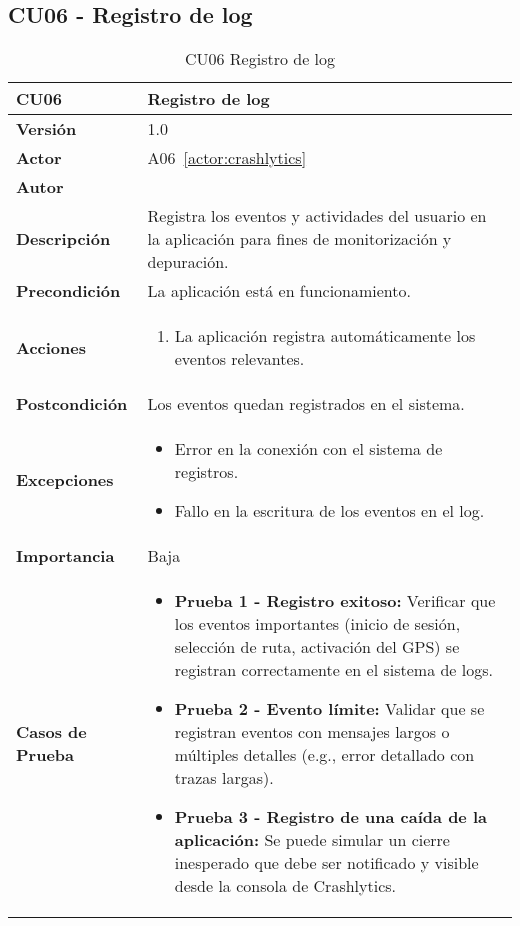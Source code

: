 \subsection{CU06 - Registro de log}
\begin{table}[H]
	\centering
	\begin{tabularx}{\linewidth}{ p{} p{} }
		\toprule
		\textbf{CU06}    & \textbf{Registro de log} \\
		\toprule
		\textbf{Versión}              & 1.0    \\
		\textbf{Actor}                & A06~\ref{actor:crashlytics} \\
		\textbf{Autor}                & \autor \\
		\textbf{Descripción}          & Registra los eventos y actividades del usuario en la aplicación para fines de monitorización y depuración. \\
		\textbf{Precondición}         & La aplicación está en funcionamiento. \\
		\textbf{Acciones}             &
		\begin{enumerate}
			\def\labelenumi{\arabic{enumi}.}
			\tightlist
			\item La aplicación registra automáticamente los eventos relevantes.
		\end{enumerate}\\
		\textbf{Postcondición}        & Los eventos quedan registrados en el sistema. \\
		\textbf{Excepciones}          & 
		\begin{itemize}
			\tightlist
			\item Error en la conexión con el sistema de registros.
			\item Fallo en la escritura de los eventos en el log.
		\end{itemize}\\
		\textbf{Importancia}          & Baja \\
		\textbf{Casos de Prueba}      &
		\begin{itemize}
			\item \textbf{Prueba 1 - Registro exitoso:} Verificar que los eventos importantes (inicio de sesión, selección de ruta, activación del GPS) se registran correctamente en el sistema de logs.
			\vspace{2pt}
			\item \textbf{Prueba 2 - Evento límite:} Validar que se registran eventos con mensajes largos o múltiples detalles (e.g., error detallado con trazas largas).
			\vspace{2pt}
			\item \textbf{Prueba 3 - Registro de una caída de la aplicación:} Se puede simular un cierre inesperado que debe ser notificado y visible desde la consola de Crashlytics.
		\end{itemize} \\
		\bottomrule
	\end{tabularx}
	\caption{CU06 Registro de log}
	\label{cu:registro-log}
\end{table}



